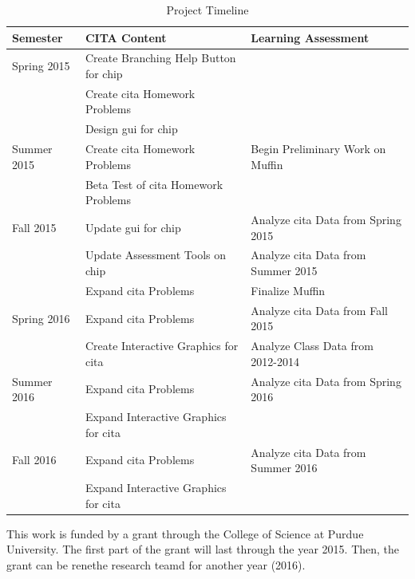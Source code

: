 \begin{landscape}
\begin{table}[!ht]
  \centering
  \begin{tabular}{|l|l|l|}
    \hline
    \textbf{Semester} & \textbf{CITA Content} & \textbf{Learning Assessment}\\
	\hline
	Spring 2015 & Create Branching Help Button for \gls{chip} & \\
	& Create \gls{cita} Homework Problems & \\
	& Design \gls{gui} for \gls{chip} & \\
	\hline
	Summer 2015 & Create \gls{cita} Homework Problems & Begin Preliminary Work on Muffin\\
	& Beta Test of \gls{cita} Homework Problems &  \\
	\hline
	Fall 2015 & Update \gls{gui} for \gls{chip} & Analyze \gls{cita} Data from Spring 2015 \\
	& Update Assessment Tools on \gls{chip} & Analyze \gls{cita} Data from Summer 2015 \\
	& Expand \gls{cita} Problems & Finalize Muffin \\
	\hline
	Spring 2016 & Expand \gls{cita} Problems & Analyze \gls{cita} Data from Fall 2015 \\
	& Create Interactive Graphics for \gls{cita} & Analyze Class Data from 2012-2014 \\
	\hline
	Summer 2016 & Expand \gls{cita} Problems & Analyze \gls{cita} Data from Spring 2016 \\
	& Expand Interactive Graphics for \gls{cita} & \\
	\hline
	Fall 2016 & Expand \gls{cita} Problems & Analyze \gls{cita} Data from Summer 2016 \\
	& Expand Interactive Graphics for \gls{cita} & \\
	\hline
  \end{tabular}
  \caption{Project Timeline}
  \label{tab:timeline}
\end{table}
\end{landscape}

\pagebreak

This work is funded by a grant through the College of Science at Purdue University. The first part of the grant will last through the year 2015. Then, the grant can be renethe research teamd for another year (2016).
